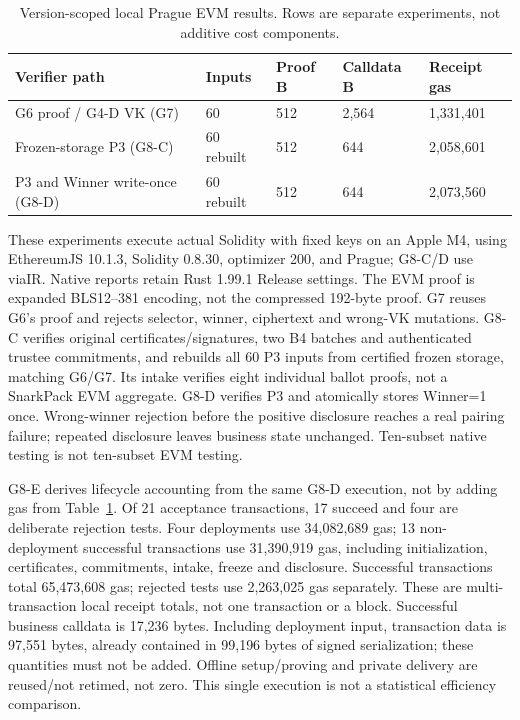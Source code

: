 \documentclass[pdflatex,sn-mathphys-num]{sn-jnl}%
\theoremstyle{thmstyleone}%
\theoremstyle{thmstyletwo}%
\theoremstyle{thmstylethree}%
\begin{document}
\begin{table}[htbp]
\centering
\caption{Version-scoped local Prague EVM results. Rows are separate experiments, not additive cost components.}
\label{tab:prototype-verifiers}
\small
\begin{tabular}{p{}p{}p{}p{}p{}}
\toprule
Verifier path & Inputs & Proof B & Calldata B & Receipt gas \\
\midrule
G6 proof / G4-D VK (G7) & 60 & 512 & 2,564 & 1,331,401 \\
Frozen-storage P3 (G8-C) & 60 rebuilt & 512 & 644 & 2,058,601 \\
P3 and Winner write-once (G8-D) & 60 rebuilt & 512 & 644 & 2,073,560 \\
\bottomrule
\end{tabular}
\end{table}

These experiments execute actual Solidity with fixed keys on an Apple M4,
using EthereumJS 10.1.3, Solidity 0.8.30, optimizer 200, and Prague; G8-C/D
use viaIR. Native reports retain Rust 1.99.1 Release settings. The EVM proof
is expanded BLS12--381 encoding, not the compressed 192-byte proof.
G7 reuses G6's proof and rejects selector, winner, ciphertext and wrong-VK
mutations. G8-C verifies original certificates/signatures, two B4 batches and
authenticated trustee commitments, and rebuilds all 60 P3 inputs from
certified frozen storage, matching G6/G7. Its intake verifies eight individual
ballot proofs, not a SnarkPack EVM aggregate. G8-D verifies P3 and atomically
stores Winner=1 once. Wrong-winner rejection before the positive disclosure
reaches a real pairing failure; repeated disclosure leaves business state
unchanged. Ten-subset native testing is not ten-subset EVM testing.

G8-E derives lifecycle accounting from the same G8-D execution, not by adding
gas from Table~\ref{tab:prototype-verifiers}. Of 21 acceptance transactions,
17 succeed and four are deliberate rejection tests. Four deployments use
34,082,689 gas; 13 non-deployment successful transactions use 31,390,919 gas,
including initialization, certificates, commitments, intake, freeze and
disclosure. Successful transactions total 65,473,608 gas; rejected tests use
2,263,025 gas separately. These are multi-transaction local receipt totals,
not one transaction or a block. Successful business calldata is 17,236 bytes.
Including deployment input, transaction data is 97,551 bytes, already
contained in 99,196 bytes of signed serialization; these quantities must not
be added. Offline setup/proving and private delivery are reused/not retimed,
not zero. This single execution is not a statistical efficiency comparison.
\end{document}
